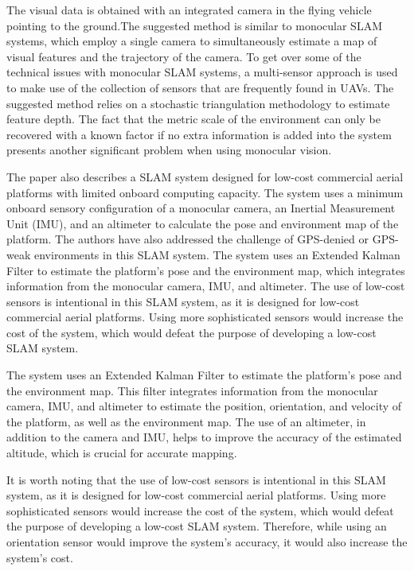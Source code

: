 \documentclass[conference]{IEEEtran}
\begin{document}
The visual data is obtained with an integrated camera in the flying vehicle pointing to the ground.The suggested method is similar to monocular SLAM systems, which employ a single camera to simultaneously estimate a map of visual features and the trajectory of the camera. To get over some of the technical issues with monocular SLAM systems, a multi-sensor approach is used to make use of the collection of sensors that are frequently found in UAVs. The suggested method relies on a stochastic triangulation methodology to estimate feature depth. The fact that the metric scale of the environment can only be recovered with a known factor if no extra information is added into the system presents another significant problem when using monocular vision\cite{chen2022end}.




The paper also describes a SLAM system designed for low-cost commercial aerial platforms with limited onboard computing capacity. The system uses a minimum onboard sensory configuration of a monocular camera, an Inertial Measurement Unit (IMU), and an altimeter to calculate the pose and environment map of the platform. The authors have also addressed the challenge of GPS-denied or GPS-weak environments in this SLAM system. The system uses an Extended Kalman Filter to estimate the platform’s pose and the environment map, which integrates information from the monocular camera, IMU, and altimeter. The use of low-cost sensors is intentional in this SLAM system, as it is designed for low-cost commercial aerial platforms. Using more sophisticated sensors would increase the cost of the system, which would defeat the purpose of developing a low-cost SLAM system.


The system uses an Extended Kalman Filter to estimate the platform's pose and the environment map. This filter integrates information from the monocular camera, IMU, and altimeter to estimate the position, orientation, and velocity of the platform, as well as the environment map. The use of an altimeter, in addition to the camera and IMU, helps to improve the accuracy of the estimated altitude, which is crucial for accurate mapping.

It is worth noting that the use of low-cost sensors is intentional in this SLAM system, as it is designed for low-cost commercial aerial platforms. Using more sophisticated sensors would increase the cost of the system, which would defeat the purpose of developing a low-cost SLAM system. Therefore, while using an orientation sensor would improve the system's accuracy, it would also increase the system's cost\cite{gupta2022slam}.
\end{document}
